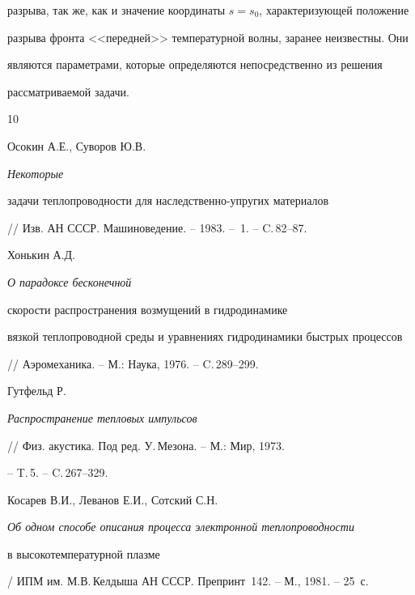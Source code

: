 разрыва, так же, как и значение координаты $s=s_0$, характеризующей положение


разрыва фронта <<передней>> температурной волны, заранее неизвестны. Они


являются параметрами, которые определяются непосредственно из решения


рассматриваемой задачи.





\begin{thebibliography}{10}







Осокин А.Е., Суворов Ю.В. {\em Некоторые 


задачи теплопроводности для наследственно-упругих материалов}


// Изв. АН СССР. Машиноведение. --  1983. -- \No\,1. -- C.\,82--87.







Хонькин А.Д. {\em О парадоксе бесконечной 


скорости распространения возмущений в гидродинамике


вязкой теплопроводной среды и уравнениях гидродинамики быстрых процессов}


// Аэромеханика. -- М.: Наука, 1976. -- C.\,289--299.







Гутфельд Р.


{\em Распространение тепловых импульсов}


// Физ. акустика. Под ред. У.\,Мезона. -- М.: Мир, 1973.


-- T.\,5. -- C.\,267--329.







Косарев В.И., Леванов Е.И., Сотский С.Н.


{\em Об одном способе описания процесса электронной теплопроводности


в высокотемпературной плазме}


/ ИПМ им. М.В.\,Келдыша АН СССР. Препринт \No\,142. -- М., 1981. -- 25~с.






\end{thebibliography}
